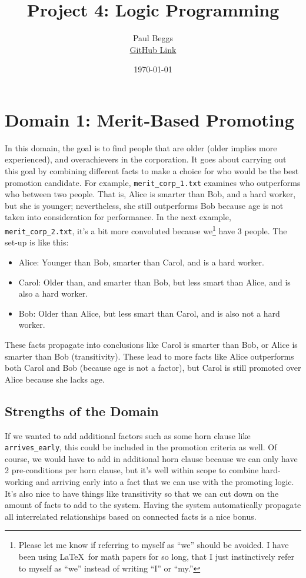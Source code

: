 \documentclass[12pt]{article}
\title{Project 4: Logic Programming}
\author{Paul Beggs \\ \href{https://github.com/PaulBeggs/Logic_Programming}{GitHub Link}}
\date{\today}
\begin{document}
\maketitle

\section{Domain 1: Merit-Based Promoting}

In this domain, the goal is to find people that are older (older implies more experienced), and overachievers in the corporation. It goes about carrying out this goal by combining different facts to make a choice for who would be the best promotion candidate. For example, \texttt{merit\_corp\_1.txt} examines who outperforms who between two people. That is, Alice is smarter than Bob, and a hard worker, but she is younger; nevertheless, she still outperforms Bob because age is not taken into consideration for performance. In the next example, \texttt{merit\_corp\_2.txt}, it's a bit more convoluted because we\footnote{Please let me know if referring to myself as ``we'' should be avoided. I have been using \LaTeX\ for math papers for so long, that I just instinctively refer to myself as ``we'' instead of writing ``I'' or ``my.''} have 3 people. The set-up is like this:
\begin{itemize}
	\item Alice: Younger than Bob, smarter than Carol, and is a hard worker.
	\item Carol: Older than, and smarter than Bob, but less smart than Alice, and is also a hard worker.
	\item Bob: Older than Alice, but less smart than Carol, and is also not a hard worker.  
\end{itemize}
These facts propagate into conclusions like Carol is smarter than Bob, or Alice is smarter than Bob (transitivity). These lead to more facts like Alice outperforms both Carol and Bob (because age is not a factor), but Carol is still promoted over Alice because she lacks age. 

\subsection{Strengths of the Domain}

If we wanted to add additional factors such as some horn clause like \texttt{arrives\_early}, this could be included in the promotion criteria as well. Of course, we would have to add in additional horn clause because we can only have 2 pre-conditions per horn clause, but it's well within scope to combine hard-working and arriving early into a fact that we can use with the promoting logic. It's also nice to have things like transitivity so that we can cut down on the amount of facts to add to the system. Having the system automatically propagate all interrelated relationships based on connected facts is a nice bonus.
\end{document}
